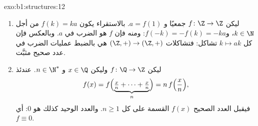 \begin{solution}{exo:b1:structures:12}
\begin{enumerate}
  \item ليكن $f \colon \Z \to \Z$ جمعيًا و $a = f(1)$. بالاستقراء
        يكون $f(k) = ka$ من أجل $k \in \N$، و$f(-k) = -f(k) =
        -ka$: ومنه فإن $f$ هو الضرب في $a$. وبالعكس فإن
        كل  $k \mapsto ak$ تشاكل: فتشاكلات
        $(\Z,+) \to (\Z,+)$ هي بالضبط عمليات الضرب في عدد
        صحيح مثبَّت.
  \item ليكن $f \colon \Q \to \Z$  وليكن $x \in \Q$ و
        $n \in \N^*$. عندئذ
        \[
        f(x) = f\Bigl(\underbrace{\tfrac xn + \dots +
        \tfrac xn}_{n}\Bigr) = n\,f\Bigl(\frac xn\Bigr) ,
        \]
        فيقبل العدد الصحيح $f(x)$ القسمة على كل $n \geq 1$.
        والعدد الوحيد كذلك هو $0$: أي $f \equiv 0$.
\end{enumerate}
\end{solution}

